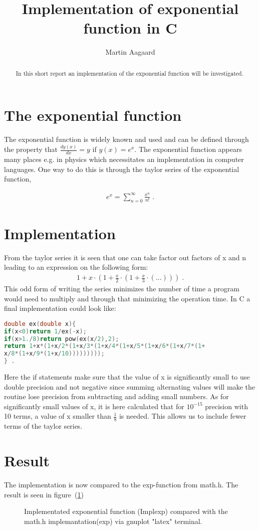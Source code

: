 \documentclass{article}
\title{Implementation of exponential function in C}
\author{Martin Aagaard}
\date{}
\begin{document}
\maketitle 
\begin{abstract}
In this short report an implementation of the exponential function
will be investigated.  
\end{abstract}

\section{The exponential function}
The exponential function is widely known and used and can be defined through the
property that $\frac{d y(x)}{dx} = y$ if $y(x)=e^x$. The exponential function
appears many places e.g. in physics which necessitates an implementation in
computer languages. One way to do this is through the taylor series of the
exponential function, 

\begin{align}
e^x=\sum^{\infty}_{n=0} \frac{x^n}{n!} \label{Taylor_exp} \; . 
\end{align}

\section{Implementation}
From the taylor series it is seen that one can take factor out factors of x and 
n leading to an expression on the following form:
\begin{align}
1+x\cdot(1+\frac{x}{2}\cdot(1+\frac{x}{3}\cdot(...))) \; .
\end{align}
This odd form of writing the series minimizes the number of time a program would
need to multiply and through that minimizing the operation time. 
In C a final implementation could look like:
\begin{lstlisting}[language=C]
double ex(double x){
if(x<0)return 1/ex(-x);
if(x>1./8)return pow(ex(x/2),2);
return 1+x*(1+x/2*(1+x/3*(1+x/4*(1+x/5*(1+x/6*(1+x/7*(1+
x/8*(1+x/9*(1+x/10)))))))));
} . 
\end{lstlisting}
Here the if statements make sure that the value of x is significantly small to
use double precision and not negative since summing alternating values will make
the routine lose precision from subtracting and adding small numbers.
As for significantly small values of x, it is here calculated that for
$10^{-15}$ precision with 10 terms, a value of x smaller than $\frac{1}{8}$ is 
needed. 
This allows us to include fewer terms of the taylor series.

\section{Result}
The implementation is now compared to the exp-function from math.h. The result
is seen in figure~(\ref{fig:exp})
	\begin{figure}

\caption{Implementated exponential function (Implexp) compared with the math.h 
implemantation(exp) via gnuplot "latex" terminal.}
\label{fig:exp}
	\end{figure} 
\end{document}
